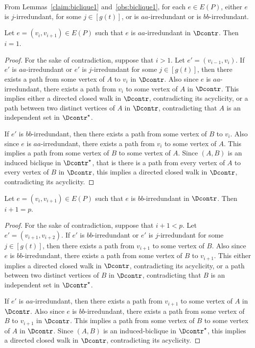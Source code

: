 From Lemmas~\ref{claim:biclique1} and~\ref{obs:biclique1}, for each $e \in E(P)$, either $e$ is $j$-irredundant, for some $j \in [g(t)]$, or is $aa$-irredundant or is $bb$-irredundant.

\begin{lemma}\label{claim:biclique21}
Let $e=(v_i,v_{i+1}) \in E(P)$ such that $e$ is $aa$-irredundant in $\Dcontr$. Then $i=1$.
\end{lemma}

\begin{proof}
For the sake of contradiction, suppose that $i>1$. Let $e'=(v_{i-1},v_i)$. 
If $e'$ is $aa$-irredundant or $e'$ is $j$-irredundant for some $j \in [g(t)]$, then there exists a path from some vertex of $A$ to $v_i$ in $\Dcontr$. Also since $e$ is $aa$-irredundant, there exists a path from $v_i$ to some vertex of $A$ in $\Dcontr$. This implies either a directed closed walk in $\Dcontr$, contradicting its acyclicity, or a path between two distinct vertices of $A$ in $\Dcontr$, contradicting that $A$ is an independent set in $\Dcontr^{\star}$.

If $e'$ is $bb$-irredundant, then there exists a path from some vertex of $B$ to $v_i$. Also since $e$ is $aa$-irredundant, there exists a path from $v_i$ to some vertex of $A$. This implies a path from some vertex of $B$ to some vertex of $A$. Since $(A,B)$ is an induced biclique in $\Dcontr^{\star}$, that is there is a path from every vertex of $A$ to every vertex of $B$ in $\Dcontr$, this implies a directed closed walk in $\Dcontr$, contradicting its acyclicity.
\end{proof}

\begin{lemma}\label{claim:biclique22}
Let $e=(v_i,v_{i+1}) \in E(P)$ such that $e$ is $bb$-irredundant in $\Dcontr$. Then $i+1=p$.
\end{lemma}

\begin{proof}
For the sake of contradiction, suppose that $i+1<p$. Let $e'=(v_{i+1},v_{i+2})$. 
If $e'$ is $bb$-irredundant or $e'$ is $j$-irredundant for some $j \in [g(t)]$, then there exists a path from $v_{i+1}$ to some vertex of $B$. Also since $e$ is $bb$-irredundant, there exists a path from some vertex of $B$ to $v_{i+1}$. This either implies a directed closed walk in $\Dcontr$, contradicting its acyclicity, or a path between two distinct vertices of $B$ in $\Dcontr$, contradicting that $B$ is an independent set in $\Dcontr^{\star}$.

If $e'$ is $aa$-irredundant, then there exists a path from $v_{i+1}$ to some vertex of $A$ in $\Dcontr$. Also since $e$ is $bb$-irredundant, there exists a path from some vertex of $B$ to $v_{i+1}$ in $\Dcontr$. This implies a path from some vertex of $B$ to some vertex of $A$ in $\Dcontr$. Since 
$(A,B)$ is an induced-biclique in $\Dcontr^{\star}$, this implies a directed closed walk
in $\Dcontr$, contradicting its acyclicity.
\end{proof}

